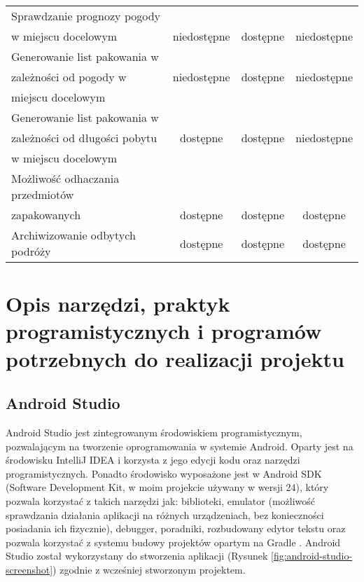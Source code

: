 \documentclass[a4paper,12pt]{article}
\begin{document}
\begin{table}[H]
\begin{tabularx}{\textwidth}{|l|c|c|c|}
				Sprawdzanie prognozy pogody & & & \\ 
				w miejscu docelowym & niedostępne & dostępne & niedostępne \\
				\hline
				Generowanie list pakowania w & & & \\ 
				zależności od pogody w & niedostępne & dostępne & niedostępne  \\ 
				miejscu docelowym & & & \\
				\hline
				Generowanie list pakowania w & & & \\ 
				zależności od długości pobytu & dostępne & dostępne & niedostępne \\ 
				w miejscu docelowym & & & \\
				\hline
				Możliwość odhaczania przedmiotów & & & \\  
				zapakowanych & dostępne & dostępne & dostępne \\
				\hline
				Archiwizowanie odbytych podróży & dostępne & dostępne & dostępne \\
				\hline
				\end{tabularx}
    \label{tab:apps-comparision}
\end{table}

\newpage
\section{Opis narzędzi, praktyk programistycznych i programów potrzebnych do realizacji projektu}

\subsection{Android Studio}

Android Studio jest zintegrowanym środowiskiem programistycznym, pozwalającym na tworzenie oprogramowania w systemie Android. Oparty jest na środowisku IntelliJ IDEA i korzysta z jego edycji kodu oraz narzędzi programistycznych. Ponadto środowisko wyposażone jest w Android SDK (Software Development Kit, w moim projekcie używany w wersji 24), który pozwala korzystać z takich narzędzi jak: biblioteki, emulator (możliwość sprawdzania działania aplikacji na różnych urządzeniach, bez konieczności posiadania ich fizycznie), debugger, poradniki, rozbudowany edytor tekstu oraz pozwala korzystać z systemu budowy projektów opartym na Gradle \cite{gradle}. Android Studio został wykorzystany do stworzenia aplikacji (Rysunek \ref{fig:android-studio-screenshot}) zgodnie z wcześniej stworzonym projektem.
\end{document}
